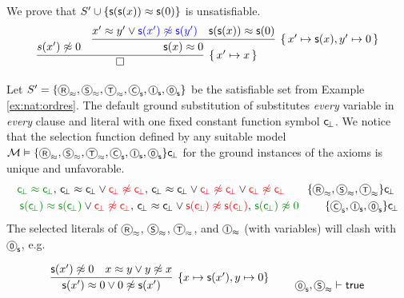 \begin{example} 
	We prove that \( S' \cup \{ \mathsf{s}(\mathsf{s}(x))\approx\mathsf{s}(0) \} \) is unsatisfiable.
	\begin{gather*}
	\infer[ \{ \, x'\mapsto x \, \}]
	{\square}
	{s(x')\mNE 0 &
		\infer[
		 \{ \, x'\mapsto \msucc(x), y'\mapsto 0 \, \}
		]{
			\msucc(x)\mEQ 0
		}{
			x' \mEQ y' \lor {\colN \msucc(x') \mNE \msucc(y')}
			& {\msucc(\msucc(x))\mEQ\msucc(0)}
		}
	}
	\end{gather*}
\end{example}

\begin{example}\label{ex:nat:instgen}
	Let \( S' = \{
		\axiom{R}_\mEQ, \axiom{S}_\mEQ, \axiom{T}_\mEQ,
		\axiom{C}_\msucc, \axiom{I}_\msucc, \axiom{0}_\msucc
		\}\) 
		be the satisfiable set from Example \vref{ex:nat:ordres}.
	The default ground substitution of \InstGen{} substitutes \emph{every} 
	variable in \emph{every} clause and literal with one fixed constant function symbol \( \mathsf{c} \!_\bot \). 
	We notice that the selection function defined 
	by any suitable model \(
		\mcM \entails \{
			\axiom{R}_\mEQ, \axiom{S}_\mEQ, \axiom{T}_\mEQ,
			\axiom{C}_\msucc, \axiom{I}_\msucc, \axiom{0}_\msucc
			\}\consbot
	\) for the ground instances of the axioms is unique and unfavorable.
	\begin{align*}
	{ \colHi \consbot \mEQ \consbot },\,
	{ \consbot \mEQ \consbot} \lor { \colLo \consbot \mNE \consbot }
	,\,
	{ \consbot \mEQ \consbot}
	\lor {\colLo \consbot \mNE \consbot}
	\lor {\colLo \consbot\mNE \consbot}
	\tag*{\( \{\axiom{R}_\mEQ, \axiom{S}_\mEQ, \axiom{T}_\mEQ\}\consbot \) }\\
	{\colHi \msucc(\consbot) \mEQ \msucc(\consbot)} \lor {\colLo \consbot \mNE \consbot}
	,\,
	{ \consbot \mEQ \consbot} \lor {\colLo \msucc(\consbot) \mNE \msucc(\consbot)}
	,\,
	{\colHi \msucc(\consbot) \mNE 0}
	\tag*{ \( \{\axiom{C}_\msucc, \axiom{I}_\msucc, \axiom{0}_\msucc \}\consbot \)}
	\end{align*}
	The selected literals of 
	\(\axiom{R}_\mEQ\), \(\axiom{S}_\mEQ\), \(\axiom{T}_\mEQ\), and \(\axiom{I}_\mEQ\) 
	(with variables) will clash with
	\(\axiom{0}_\msucc\), e.g.

	\begin{align*}
		\infer[\{ x\mapsto \msucc(x'), y\mapsto 0 \}]{
			\msucc(x') \mEQ 0 \lor 0 \mNE \msucc(x')
		}{
			\msucc(x')\mNE 0 & x \mEQ y  \lor y \mNE x
		}
		\tag*{ \( \axiom{0}_\msucc, \axiom{S}_\mEQ \proves \true \)}
		\end{align*}


\end{example}
